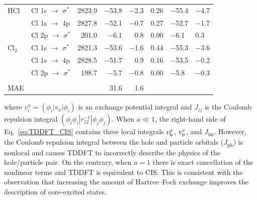 \documentclass[12pt]{article}
\begin{document}
\begin{table}[!t]
\begin{tabular*}{11.5cm}{@{\extracolsep{\fill} }llrrrcHH}
    HCl       & Cl 1s $\rightarrow$ $\sigma^*$     & 2823.9 & $-$53.8     & $-$2.3 & 0.26  & $-$55.4    & $-$4.7  \\
    ~         & Cl 1s $\rightarrow$ 4p          & 2827.8 & $-$52.1      & $-$0.7 & 0.27   & $-$52.7    & $-$1.7  \\
    ~         & Cl 2p $\rightarrow$  $\sigma^*$    & 201.0 & $-$6.1 & 0.8 & 0.00   & $-$6.1    & 0.3 \\
    Cl$_2$      & Cl 1s $\rightarrow$ $\sigma^*$          & 2821.3   & $-$53.6      & $-$1.6  & 0.44 & $-$55.3    & $-$3.6   \\
    ~         & Cl 1s $\rightarrow$ 4p          & 2828.5 & $-$51.7    & 0.9 & 0.16  & $-$53.5     & $-$0.2  \\
        ~         & Cl 2p $\rightarrow$  $\sigma^*$    & 198.7 & $-$5.7     & $-$0.8 & 0.00  & $-$5.8    & $-$0.3\\\\
    MAE         &                            & ~     & 31.6      & 1.6   &  \\
    \hline
    \hline
    \end{tabular*}
     \label{table:SecondRow}
\end{table}
where $v_{i}^x = (\phi_{i}|v_x|\phi_{i})$ is an exchange potential integral and $J_{ij}$ is the Coulomb repulsion integral $(\phi_i \phi_i|r_{12}^{-1}|\phi_j \phi_j)$. When $a \ll 1$, the right-hand side of Eq.~\ref{eq:TDDFT_CIS} contains three local integrals $v_{\rm h}^x$, $v_{\rm p}^x$, and $J_{\text{hh}}$. However, the Coulomb repulsion integral between the hole and particle orbitals ($J_{\text{ph}}$) is nonlocal and causes TDDFT to incorrectly describe the physics of the hole/particle pair.
On the contrary, when $a=1$ there is exact cancellation of the nonlinear terms and TDDFT is equivalent to CIS.
This is consistent with the observation that increasing the amount of Hartree--Fock exchange improves the description of core-excited states.\cite{heyd_hybrid_2003,nakata_time-dependent_2006,song_core-excitation_2008,henderson_importance_2007,henderson_assessment_2008}
 
\end{document}
